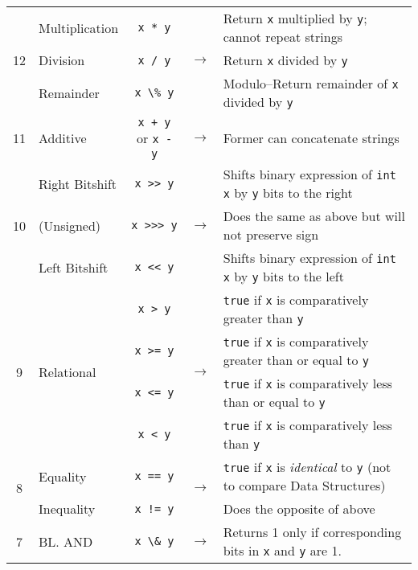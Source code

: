 \documentclass{article}
\begin{document}
\begin{center}
\begin{tabularx}{\textwidth}{clccX}
 \multirow{3}{*}{12}  & Multiplication    & \lstinline|x * y| & \multirow{3}{*}{\(\to\)} & Return \lstinline|x| multiplied by \lstinline|y|; cannot repeat strings\\
                      & Division          & \lstinline|x / y| & & Return \lstinline|x| divided by \lstinline|y|\\
                      & Remainder         & \lstinline|x \% y| & & Modulo--Return remainder of \lstinline|x| divided by \lstinline|y|\\\midrule
                  11  & Additive          & \lstinline|x + y| or \lstinline|x - y| & \(\to\) & Former can concatenate strings\\\midrule
  \multirow{3}{*}{10} & Right Bitshift & \lstinline|x >> y| & \multirow{3}{*}{\(\to\)} & Shifts binary expression of \lstinline|int x| by \lstinline|y| bits to the right\\
                      & (Unsigned) & \lstinline|x >>> y| & & Does the same as above but will not preserve sign\\
                      & Left Bitshift & \lstinline|x << y| & & Shifts binary expression of \lstinline|int x| by \lstinline|y| bits to the left\\\midrule
  \multirow{4}{*}{9}   & \multirow{4}{*}{Relational}        & \lstinline|x > y| & \multirow{4}{*}{\(\to\)} & \lstinline|true| if \lstinline|x| is comparatively greater than \lstinline|y| \\
                      &                   & \lstinline|x >= y| & & \lstinline|true| if \lstinline|x| is comparatively greater than or equal to \lstinline|y| \\
                      &                   & \lstinline|x <= y| & & \lstinline|true| if \lstinline|x| is comparatively less than or equal to \lstinline|y| \\
                      &                   & \lstinline|x < y| & & \lstinline|true| if \lstinline|x| is comparatively less than \lstinline|y| \\\midrule
  \multirow{2}{*}{8}  & Equality          & \lstinline|x == y|    & \multirow{2}{*}{\(\to\)} & \lstinline|true| if \lstinline|x| is \textit{identical} to \lstinline|y| (not to compare Data Structures)\\
                      & Inequality        & \lstinline|x != y|    &  & Does the opposite of above\\\midrule
                  7   & BL. AND           & \lstinline|x \& y|    & \(\to\) & Returns 1 only if corresponding bits in \lstinline|x| and \lstinline|y| are 1. \\\midrule

\end{tabularx}
\end{center}
\end{document}

